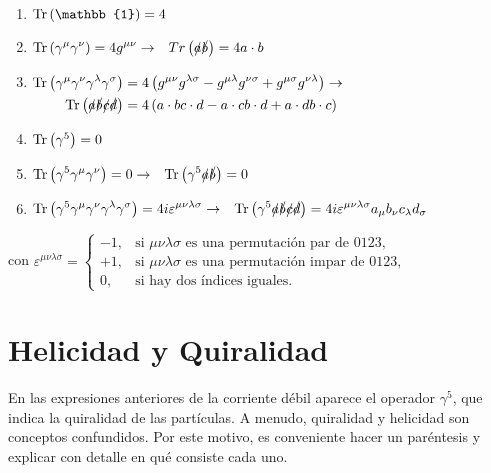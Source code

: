 \begin{enumerate}
\item $\Tr\left(\mathbb{1}\right)=4$
\item $\begin{aligned}[t]
\operatorname{Tr}\left( \gamma ^{\mu }\gamma ^{\nu }\right)&=4g^{\mu \nu }\rightarrow & Tr\left(\slashed{a}\slashed{b}\right) &=4a\cdot b
\end{aligned}$
\item $\begin{aligned}[t]
\operatorname{Tr}\left( \gamma ^{\mu }\gamma ^{\nu }\gamma ^{\lambda }\gamma ^{\sigma }\right)&= 4\left( g^{\mu\nu}g^{\lambda \sigma} -g^{\mu \lambda }g^{\nu \sigma }+g^{\mu \sigma }g^{\nu \lambda }\right) \rightarrow \\ \operatorname{Tr}\left(\slashed{a}\slashed{b}\slashed{c}\slashed{d}\right) &=4\left( a\cdot bc\cdot d-a\cdot cb\cdot d+a\cdot db\cdot c\right)
\end{aligned}$
\item $\operatorname{Tr}\left( \gamma ^{5}\right)=0$
\item $\begin{aligned}[t]
\operatorname{Tr}\left( \gamma ^{5}\gamma ^{\mu }\gamma ^{\nu }\right)&=0 \rightarrow & \operatorname{Tr}\left(\gamma ^{5}\slashed{a}\slashed{b}\right) &=0 
\end{aligned}$
\item $\begin{aligned}[t]
\operatorname{Tr}\left( \gamma ^{5}\gamma ^{\mu }\gamma ^{\nu }\gamma ^{\lambda }\gamma ^{\sigma }\right)&=4i\varepsilon ^{\mu \nu \lambda \sigma } \rightarrow & \operatorname{Tr}\left(\gamma ^{5}\slashed{a}\slashed{b}\slashed{c}\slashed{d}\right) &=4i\varepsilon ^{\mu \nu \lambda \sigma }a_{\mu }b_{\nu }c_{\lambda }d_{\sigma } 
\end{aligned}$
\end{enumerate}

con $\varepsilon^{\mu\nu\lambda\sigma} = \left\{\begin{array}{lr}
        -1, & \text{si $\mu\nu\lambda\sigma$ es una permutación par de 0123},\\
        +1, & \text{si $\mu\nu\lambda\sigma$ es una permutación impar de 0123},\\
        0, & \text{si hay dos índices iguales}.
        \end{array}\right. $

\section{Helicidad y Quiralidad}\label{sec:quirality}
En las expresiones anteriores de la corriente débil aparece el operador $\gamma^5$, que indica la quiralidad de las partículas. A menudo, quiralidad y helicidad son conceptos confundidos. Por este motivo, es conveniente hacer un paréntesis y explicar con detalle en qué consiste cada uno.

